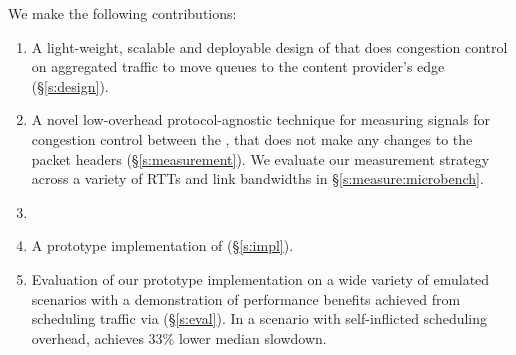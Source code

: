 We make the following contributions:
\begin{enumerate}
     \item A light-weight, scalable and deployable design of \name that does congestion control on aggregated traffic to move queues to the content provider's edge (\S\ref{s:design}).  
     \item A novel low-overhead protocol-agnostic technique for measuring signals for congestion control between the \pair, that does not make any changes to the packet headers (\S\ref{s:measurement}). We evaluate our measurement strategy across a variety of RTTs and link bandwidths in \S\ref{s:measure:microbench}. 
     \item {}
     \item A prototype implementation of \name (\S\ref{s:impl}).
     \item Evaluation of our prototype implementation on a wide variety of emulated scenarios with a demonstration of performance benefits achieved from scheduling traffic via \name (\S\ref{s:eval}).
     In a scenario with self-inflicted scheduling overhead, \name achieves 33\% lower median slowdown.
 \end{enumerate}


